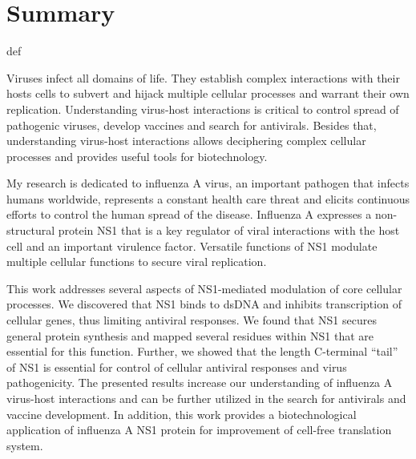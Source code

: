 \documentclass[a4paper,12pt]{article} %
\providecommand{\phantomsection}{def} %
\begin{document}

\pagebreak
\section*{Summary}
\phantomsection %

Viruses infect all domains of life. They establish complex interactions with their hosts cells to subvert and hijack multiple cellular processes and warrant their own replication. Understanding virus-host interactions is critical to control spread of pathogenic viruses, develop vaccines and search for antivirals. Besides that, understanding virus-host interactions allows deciphering complex cellular processes and provides useful tools for biotechnology.

My research is dedicated to influenza A virus, an important pathogen that infects humans worldwide, represents a constant health care threat and elicits continuous efforts to control the human spread of the disease. Influenza A expresses a non-structural protein NS1 that is a key regulator of viral interactions with the host cell and an important virulence factor. Versatile functions of NS1 modulate multiple cellular functions to secure viral replication.

This work addresses several aspects of NS1-mediated modulation of core cellular processes. We discovered that NS1 binds to dsDNA and inhibits transcription of cellular genes, thus limiting antiviral responses. We found that NS1 secures general protein synthesis and mapped several residues within NS1 that are essential for this function. Further, we showed that the length C-terminal ``tail'' of NS1 is essential for control of cellular antiviral responses and virus pathogenicity. The presented results increase our understanding of influenza A virus-host interactions and can be further utilized in the search for antivirals and vaccine development. In addition, this work provides a biotechnological application of influenza A NS1 protein for improvement of cell-free translation system.



\pagebreak
\printglossary[type=acronym, title={Abbreviations}]
\clearpage
\end{document}
